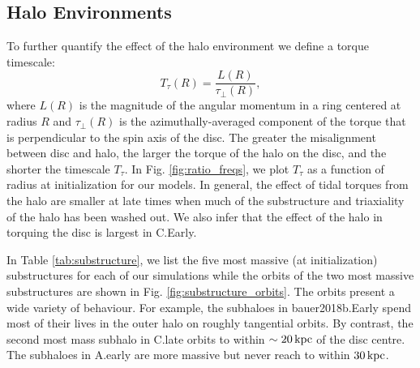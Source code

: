 \subsection{Halo Environments} \label{ssec:halo_env}

To further quantify the effect of the halo environment we define a
torque timescale:
\begin{equation}
T_\tau(R) = \frac{L(R)}{\tau_\perp(R)},
\end{equation}
where $L(R)$ is the magnitude of the angular momentum in a ring
centered at radius $R$ and $\tau_\perp(R)$ is the azimuthally-averaged
component of the torque that is perpendicular to the spin axis of the
disc.  The greater the misalignment between disc and halo, the larger
the torque of the halo on the disc, and the shorter the timescale
$T_\tau$. In Fig. \ref{fig:ratio_freqs}, we plot $T_\tau$ as a
function of radius at initialization for our models. In general, the
effect of tidal torques from the halo are smaller at late times when
much of the substructure and triaxiality of the halo has been washed
out. We also infer that the effect of the halo in torquing the disc is
largest in C.Early.

In Table \ref{tab:substructure}, we list the five most massive (at
initialization) substructures for each of our simulations while the
orbits of the two most massive substructures are shown in
Fig. \ref{fig:substructure_orbits}.  The orbits present a wide variety
of behaviour. For example, the subhaloes in bauer2018b.Early spend
most of their lives in the outer halo on roughly tangential orbits. By
contrast, the second most mass subhalo in C.late orbits to within
$\sim 20\,{\rm kpc}$ of the disc centre. The subhaloes in A.early are
more massive but never reach to within $30\,{\rm kpc}$.

